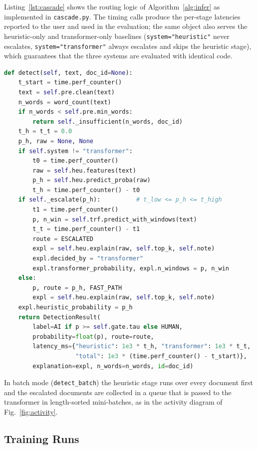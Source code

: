 Listing~\ref{lst:cascade} shows the routing logic of
Algorithm~\ref{alg:infer} as implemented in \texttt{cascade.py}. The timing
calls produce the per-stage latencies reported to the user and used in the
evaluation; the same object also serves the heuristic-only and
transformer-only baselines (\texttt{system="heuristic"} never escalates,
\texttt{system="transformer"} always escalates and skips the heuristic stage),
which guarantees that the three systems are evaluated with identical code.

\begin{lstlisting}[language=Python,caption={Cascade inference (excerpt of \texttt{cascade.py})},label={lst:cascade}]
def detect(self, text, doc_id=None):
    t_start = time.perf_counter()
    text = self.pre.clean(text)
    n_words = word_count(text)
    if n_words < self.pre.min_words:
        return self._insufficient(n_words, doc_id)
    t_h = t_t = 0.0
    p_h, raw = None, None
    if self.system != "transformer":
        t0 = time.perf_counter()
        raw = self.heu.features(text)
        p_h = self.heu.predict_proba(raw)
        t_h = time.perf_counter() - t0
    if self._escalate(p_h):          # t_low <= p_h <= t_high
        t1 = time.perf_counter()
        p, n_win = self.trf.predict_with_windows(text)
        t_t = time.perf_counter() - t1
        route = ESCALATED
        expl = self.heu.explain(raw, self.top_k, self.note)
        expl.decided_by = "transformer"
        expl.transformer_probability, expl.n_windows = p, n_win
    else:
        p, route = p_h, FAST_PATH
        expl = self.heu.explain(raw, self.top_k, self.note)
    expl.heuristic_probability = p_h
    return DetectionResult(
        label=AI if p >= self.gate.tau else HUMAN,
        probability=float(p), route=route,
        latency_ms={"heuristic": 1e3 * t_h, "transformer": 1e3 * t_t,
                    "total": 1e3 * (time.perf_counter() - t_start)},
        explanation=expl, n_words=n_words, id=doc_id)
\end{lstlisting}

In batch mode (\texttt{detect\_batch}) the heuristic stage runs over every
document first and the escalated documents are collected in a queue that is
passed to the transformer in length-sorted mini-batches, as in the activity
diagram of Fig.~\ref{fig:activity}.

\subsection{Training Runs}

